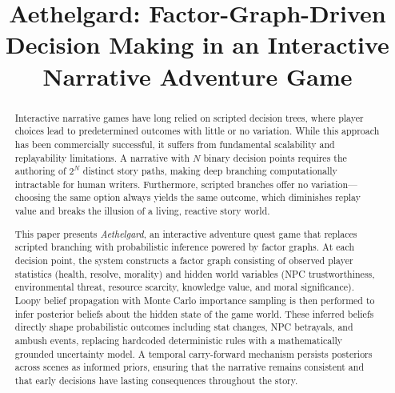 \documentclass[journal]{IEEEtran}
\begin{document}
\title{Aethelgard: Factor-Graph-Driven Decision Making in an Interactive Narrative Adventure Game}

\author{
}

\maketitle

\begin{abstract}
Interactive narrative games have long relied on scripted decision trees, where player choices lead to predetermined outcomes with little or no variation. While this approach has been commercially successful, it suffers from fundamental scalability and replayability limitations. A narrative with $N$ binary decision points requires the authoring of $2^N$ distinct story paths, making deep branching computationally intractable for human writers. Furthermore, scripted branches offer no variation---choosing the same option always yields the same outcome, which diminishes replay value and breaks the illusion of a living, reactive story world.

This paper presents \textit{Aethelgard}, an interactive adventure quest game that replaces scripted branching with probabilistic inference powered by factor graphs. At each decision point, the system constructs a factor graph consisting of observed player statistics (health, resolve, morality) and hidden world variables (NPC trustworthiness, environmental threat, resource scarcity, knowledge value, and moral significance). Loopy belief propagation with Monte Carlo importance sampling is then performed to infer posterior beliefs about the hidden state of the game world. These inferred beliefs directly shape probabilistic outcomes including stat changes, NPC betrayals, and ambush events, replacing hardcoded deterministic rules with a mathematically grounded uncertainty model. A temporal carry-forward mechanism persists posteriors across scenes as informed priors, ensuring that the narrative remains consistent and that early decisions have lasting consequences throughout the story.


\end{abstract}
\end{document}
